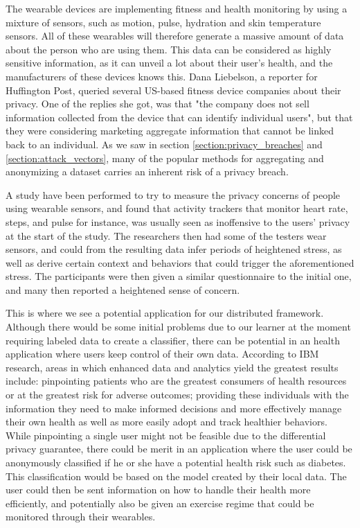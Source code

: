 The wearable devices are implementing fitness and health monitoring by using a mixture of sensors, such as motion, pulse, hydration and skin temperature sensors. All of these wearables will therefore generate a massive amount of data about the person who are using them. This data can be considered as highly sensitive information, as it can unveil a lot about their user's health, and the manufacturers of these devices knows this. Dana Liebelson, a reporter for Huffington Post, queried several US-based fitness device companies about their privacy. One of the replies she got, was that "the company does not sell information collected from the device that can identify individual users", but that they were considering marketing aggregate information that cannot be linked back to an individual\citep{liebelson2014wearables}. As we saw in section \ref{section:privacy_breaches} and \ref{section:attack_vectors}, many of the popular methods for aggregating and anonymizing a dataset carries an inherent risk of a privacy breach.

A study \citep{raij2011privacyConcernWearables} have been performed to try to measure the privacy concerns of people using wearable sensors, and found that activity trackers that monitor heart rate, steps, and pulse for instance, was usually seen as inoffensive to the users’ privacy at the start of the study. The researchers then had some of the testers wear sensors, and could from the resulting data infer periods of heightened stress, as well as derive certain context and behaviors that could trigger the aforementioned stress. The participants were then given a similar questionnaire to the initial one, and many then reported a heightened sense of concern. 
  
This is where we see a potential application for our distributed framework. Although there would be some initial problems due to our learner at the moment requiring labeled data to create a classifier, there can be potential in an health application where users keep control of their own data. According to IBM research, areas in which enhanced data and analytics yield the greatest results include: pinpointing patients who are the greatest consumers of health resources or at the greatest risk for adverse outcomes; providing these individuals with the information they need to make informed decisions and more effectively manage their own health as well as more easily adopt and track healthier behaviors\citep{IBM2013reportBigDataHealth}. While pinpointing a single user might not be feasible due to the differential privacy guarantee, there could be merit in an application where the user could be anonymously classified if he or she have a potential health risk such as diabetes. This classification would be based on the model created by their local data. The user could then be sent information on how to handle their health more efficiently, and potentially also be given an exercise regime that could be monitored through their wearables. 


